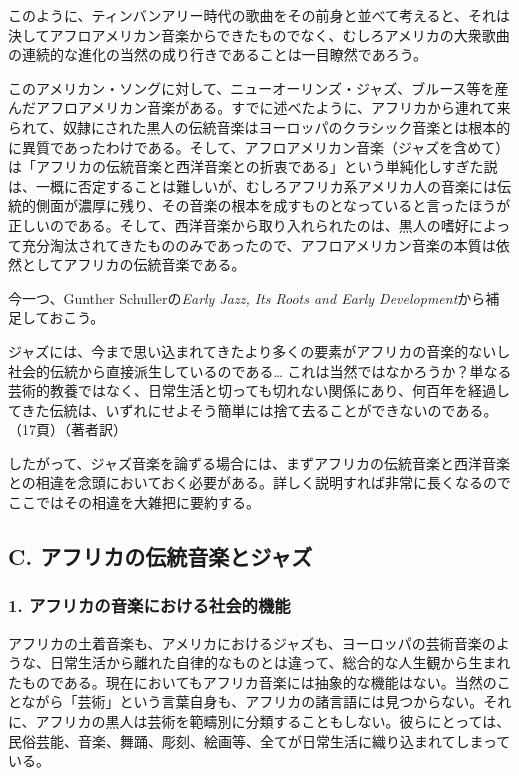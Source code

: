 このように、ティンバンアリー時代の歌曲をその前身と並べて考えると、それは決してアフロアメリカン音楽からできたものでなく、むしろアメリカの大衆歌曲の連続的な進化の当然の成り行きであることは一目瞭然であろう。

このアメリカン・ソングに対して、ニューオーリンズ・ジャズ、ブルース等を産んだアフロアメリカン音楽がある。すでに述べたように、アフリカから連れて来られて、奴隷にされた黒人の伝統音楽はヨーロッパのクラシック音楽とは根本的に異質であったわけである。そして、アフロアメリカン音楽（ジャズを含めて）は「アフリカの伝統音楽と西洋音楽との折衷である」という単純化しすぎた説は、一概に否定することは難しいが、むしろアフリカ系アメリカ人の音楽には伝統的側面が濃厚に残り、その音楽の根本を成すものとなっていると言ったほうが正しいのである。そして、西洋音楽から取り入れられたのは、黒人の嗜好によって充分淘汰されてきたもののみであったので、アフロアメリカン音楽の本質は依然としてアフリカの伝統音楽である。

今一つ、Gunther Schullerの\textit{Early Jazz, Its Roots and Early Development}から補足しておこう。

\begin{gquote}
ジャズには、今まで思い込まれてきたより多くの要素がアフリカの音楽的ないし社会的伝統から直接派生しているのである… これは当然ではなかろうか？単なる芸術的教養ではなく、日常生活と切っても切れない関係にあり、何百年を経過してきた伝統は、いずれにせよそう簡単には捨て去ることができないのである。（17頁）（著者訳）
\end{gquote}

したがって、ジャズ音楽を論ずる場合には、まずアフリカの伝統音楽と西洋音楽との相違を念頭においておく必要がある。詳しく説明すれば非常に長くなるのでここではその相違を大雑把に要約する。

\subsection{C. アフリカの伝統音楽とジャズ}

\subsubsection{1. アフリカの音楽における社会的機能}

アフリカの土着音楽も、アメリカにおけるジャズも、ヨーロッパの芸術音楽のような、日常生活から離れた自律的なものとは違って、総合的な人生観から生まれたものである。現在においてもアフリカ音楽には抽象的な機能はない。当然のことながら「芸術」という言葉自身も、アフリカの諸言語には見つからない。それに、アフリカの黒人は芸術を範疇別に分類することもしない。彼らにとっては、民俗芸能、音楽、舞踊、彫刻、絵画等、全てが日常生活に織り込まれてしまっている。

